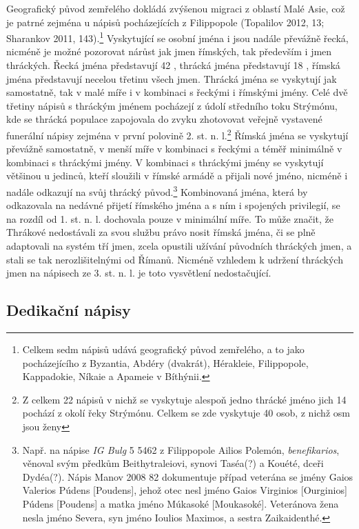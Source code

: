 Geografický původ zemřelého dokládá zvýšenou migraci z oblastí Malé Asie, což je patrné zejména u nápisů pocházejících z Filippopole (Topalilov 2012, 13; Sharankov 2011, 143).\footnote{Celkem sedm nápisů udává geografický původ zemřelého, a to jako pocházejícího z Byzantia, Abdéry (dvakrát), Hérakleie, Filippopole, Kappadokie, Níkaie a Apameie v Bíthýnii.} Vyskytující se osobní jména i jsou nadále převážně řecká, nicméně je možné pozorovat nárůst jak jmen římských, tak především i jmen thráckých. Řecká jména představují 42 , thrácká jména představují 18 , římská jména představují necelou třetinu všech jmen. Thrácká jména se vyskytují jak samostatně, tak v malé míře i v kombinaci s řeckými i římskými jmény. Celé dvě třetiny nápisů s thráckým jménem pocházejí z údolí středního toku Strýmónu, kde se thrácká populace zapojovala do zvyku zhotovovat veřejně vystavené funerální nápisy zejména v první polovině 2. st. n. l.\footnote{Z celkem 22 nápisů v nichž se vyskytuje alespoň jedno thrácké jméno jich 14 pochází z okolí řeky Strýmónu. Celkem se zde vyskytuje 40 osob, z nichž osm jsou ženy} Římská jména se vyskytují převážně samostatně, v menší míře v kombinaci s řeckými a téměř minimálně v kombinaci s thráckými jmény. V kombinaci s thráckými jmény se vyskytují většinou u jedinců, kteří sloužili v římské armádě a přijali nové jméno, nicméně i nadále odkazují na svůj thrácký původ.\footnote{Např. na nápise {\em IG Bulg} 5 5462 z Filippopole Ailios Polemón, {\em benefikarios}, věnoval svým předkům Beithytraleiovi, synovi Taséa(?) a Kouété, dceři Dydéa(?). Nápis Manov 2008 82 dokumentuje případ veterána se jmény Gaios Valerios Púdens {[}Poudens{]}, jehož otec nesl jméno Gaios Virginios {[}Ourginios{]} Púdens {[}Poudens{]} a matka jméno Múkasoké {[}Moukasoké{]}. Veteránova žena nesla jméno Severa, syn jméno Ioulios Maximos, a sestra Zaikaidenthé.} Kombinovaná jména, která by odkazovala na nedávné přijetí římského jména a s ním i spojených privilegií, se na rozdíl od 1. st. n. l. dochovala pouze v minimální míře. To může značit, že Thrákové nedostávali za svou službu právo nosit římská jména, či se plně adaptovali na systém tří jmen, zcela opustili užívání původních thráckých jmen, a stali se tak nerozlišitelnými od Římanů. Nicméně vzhledem k udržení thráckých jmen na nápisech ze 3. st. n. l. je toto vysvětlení nedostačující.

\subsection[dedikační-nápisy-13]{Dedikační nápisy}

